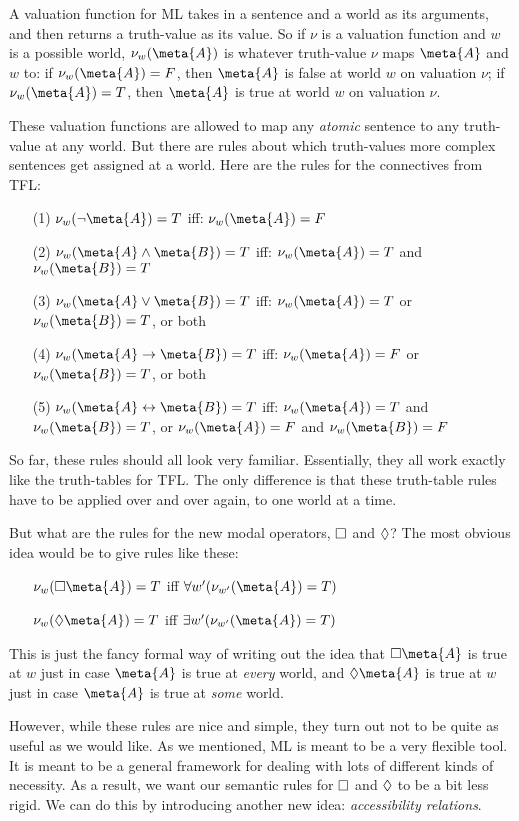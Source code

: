 A valuation function for ML takes in a sentence and a world as its arguments, and then returns a truth-value as its value. So if $\nu$ is a valuation function and $w$ is a possible world, $\nu_w(\meta{A})$ is whatever truth-value $\nu$ maps $\meta{A}$ and $w$ to: if $\nu_w(\meta{A})=F$, then $\meta{A}$ is false at world $w$ on valuation $\nu$; if $\nu_w(\meta{A})=T$, then $\meta{A}$ is true at world $w$ on valuation $\nu$.

These valuation functions are allowed to map any \emph{atomic} sentence to any truth-value at any world. But there are rules about which truth-values more complex sentences get assigned at a world. Here are the rules for the connectives from TFL:
\begin{itemize}
	\item[(1)]$\nu_w(\enot\meta{A})=T$ iff: $\nu_w(\meta{A})=F$
	\item[(2)]$\nu_w(\meta{A}\eand\meta{B})=T$ iff: $\nu_w(\meta{A})=T$ and $\nu_w(\meta{B})=T$
	\item[(3)]$\nu_w(\meta{A}\eor\meta{B})=T$ iff: $\nu_w(\meta{A})=T$ or $\nu_w(\meta{B})=T$, or both
	\item[(4)]$\nu_w(\meta{A}\eif\meta{B})=T$ iff: $\nu_w(\meta{A})=F$ or $\nu_w(\meta{B})=T$, or both
	\item[(5)]$\nu_w(\meta{A}\eiff\meta{B})=T$ iff: $\nu_w(\meta{A})=T$ and $\nu_w(\meta{B})=T$, or $\nu_w(\meta{A})=F$ and $\nu_w(\meta{B})=F$
\end{itemize}
So far, these rules should all look very familiar. Essentially, they all work exactly like the truth-tables for TFL. The only difference is that these truth-table rules have to be applied over and over again, to one world at a time.

But what are the rules for the new modal operators, $\Box$ and $\Diamond$? The most obvious idea would be to give rules like these:
\begin{itemize}
	\item[]$\nu_w(\ebox \meta{A})=T$ iff $\forall w' (\nu_{w'}(\meta{A})=T)$
	\item[]$\nu_w(\ediamond \meta{A})=T$ iff $\exists w' (\nu_{w'}(\meta{A})=T)$
\end{itemize}
This is just the fancy formal way of writing out the idea that $\ebox\meta{A}$ is true at $w$ just in case $\meta{A}$ is true at \emph{every} world, and $\ediamond\meta{A}$ is true at $w$ just in case $\meta{A}$ is true at \emph{some} world.

However, while these rules are nice and simple, they turn out not to be quite as useful as we would like. As we mentioned, ML is meant to be a very flexible tool. It is meant to be a general framework for dealing with lots of different kinds of necessity. As a result, we want our semantic rules for $\Box$ and $\Diamond$ to be a bit less rigid. We can do this by introducing another new idea: \emph{accessibility relations}.

